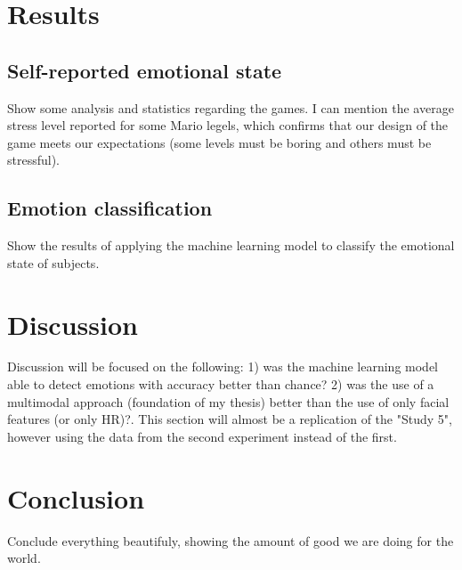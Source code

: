 \section{Results}

\subsection{Self-reported emotional state}
Show some analysis and statistics regarding the games. I can mention the average stress level reported for some Mario legels, which confirms that our design of the game meets our expectations (some levels must be boring and others must be stressful).

\subsection{Emotion classification}
Show the results of applying the machine learning model to classify the emotional state of subjects.

\section{Discussion}
Discussion will be focused on the following: 1) was the machine learning model able to detect emotions with accuracy better than chance? 2) was the use of a multimodal approach (foundation of my thesis) better than the use of only facial features (or only HR)?. This section will almost be a replication of the "Study 5", however using the data from the second experiment instead of the first.

\section{Conclusion}

Conclude everything beautifuly, showing the amount of good we are doing for the world.

